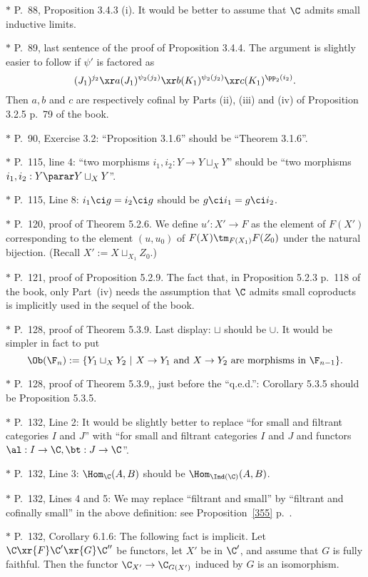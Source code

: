 \documentclass[12pt]{article}
\theoremstyle{remark}
\theoremstyle{definition}
\begin{document}
\nn$*$ P.~88, Proposition 3.4.3 (i). It would be better to assume that $\C$ admits small inductive limits.

\nn$*$ P.~89, last sentence of the proof of Proposition 3.4.4. The argument is slightly easier to follow if $\psi'$ is factored as 
$$
(J_1)^{j_2}\xr a(J_1)^{\psi_2(j_2)}\xr b(K_1)^{\psi_2(j_2)}\xr c(K_1)^{\pp_2(i_2)}.
$$ 
Then $a,b$ and $c$ are respectively cofinal by Parts (ii), (iii) and (iv) of Proposition 3.2.5 p.~79 of the book.

\nn$*$ P.~90, Exercise 3.2: ``Proposition 3.1.6'' should be ``Theorem 3.1.6''.

\nn$*$ P.~115, line 4: ``two morphisms $i_1,i_2:Y\to Y\sqcup_XY$'' should be ``two morphisms $i_1,i_2:Y\parar Y\sqcup_XY$''. 

\nn$*$ P.~115, Line 8: $i_1\ci g=i_2\ci g$ should be $g\ci i_1=g\ci i_2$.

\nn$*$ P.~120, proof of Theorem 5.2.6. We define $u':X'\to F$ as the element of $F(X')$ corresponding to the element $(u,u_0)$ of $F(X)\tm_{F(X_1)}F(Z_0)$ under the natural bijection. (Recall $X':=X\sqcup_{X_1}Z_0$.)

\nn$*$ P.~121, proof of Proposition 5.2.9. The fact that, in Proposition 5.2.3 p.~118 of the book, only Part~(iv) needs the assumption that $\C$ admits small coproducts is implicitly used in the sequel of the book.

\nn$*$ P.~128, proof of Theorem 5.3.9. Last display: $\sqcup$ should be $\cup$. It would be simpler in fact to put 
$$
\Ob(\F_n):=\{Y_1\sqcup_XY_2\ |\ X\to Y_1\text{ and }X\to Y_2\text{ are morphisms in }\F_{n-1}\}.
$$ 

\nn$*$ P.~128, proof of Theorem 5.3.9,, just before the ``q.e.d.'': Corollary 5.3.5 should be Proposition 5.3.5.

\nn$*$ P.~132, Line 2: It would be slightly better to replace ``for small and filtrant categories $I$ and $J$'' with ``for small and filtrant categories $I$ and $J$ and functors $\al:I\to\C,\bt:J\to\C$''.

\nn$*$ P.~132, Line 3: $\Hom_\C(A,B)$ should be $\Hom_{\Ind(\C)}(A,B)$.

\nn$*$ P.~132, Lines 4 and 5: \guillemotleft We may replace ``filtrant and small'' by ``filtrant and cofinally small'' in the above definition\guillemotright: see Proposition~\ref{355} p.~.

\nn$*$ P.~132, Corollary 6.1.6: The following fact is implicit. Let $\C\xr{F}\C'\xr{G}\C''$ be functors, let $X'$ be in $\C'$, and assume that $G$ is fully faithful. Then the functor $\C_{X'}\to\C_{G(X')}$ induced by $G$ is an isomorphism.
\end{document}
